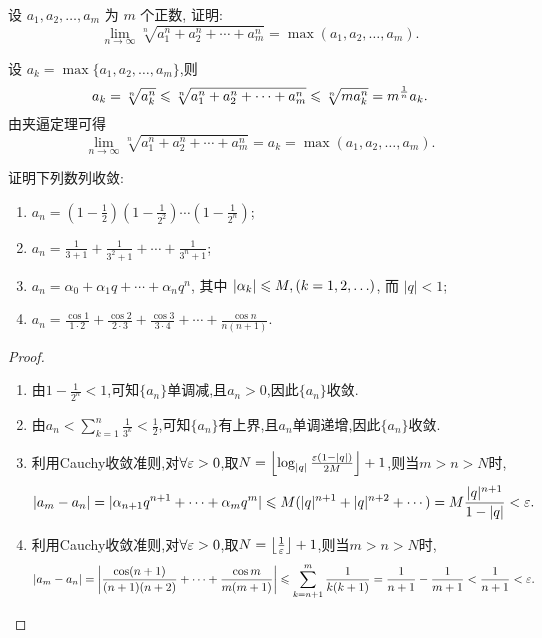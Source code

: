 \begin{exercise}[1.2.16]
    设 $a_1, a_2, \ldots, a_m$ 为 $m$ 个正数, 证明:
    $$
        \lim_{n\to\infty} \sqrt[n]{a_1^n + a_2^n + \cdots + a_m^n} = \max(a_1, a_2, \ldots, a_m).
    $$
\end{exercise}

\begin{solution}
    设 $a_k = \max \{a_1, a_2, \ldots, a_m \}$,则
    $$
        a_k = \sqrt[n]{a_k^n} \leqslant \sqrt[n]{a_1^n + a_2^n + \cdots + a_m^n} \leqslant \sqrt[n]{m a_k^n} = m^{\frac{1}{n}} a_k.
    $$
    由夹逼定理可得
    $$
        \lim_{n\to\infty} \sqrt[n]{a_1^n + a_2^n + \cdots + a_m^n} = a_k = \max(a_1, a_2, \ldots, a_m).
    $$
\end{solution}

\begin{exercise}[1.2.17]
    证明下列数列收敛:
    \begin{enumerate}[(1)]
        \item $a_n = \left(1 - \frac{1}{2}\right) \left(1 - \frac{1}{2^2}\right) \cdots \left(1 - \frac{1}{2^n}\right)$;
        \item $a_n = \frac{1}{3+1} + \frac{1}{3^2+1} + \cdots + \frac{1}{3^n+1}$;
        \item $a_n = \alpha_0 + \alpha_1 q + \cdots + \alpha_n q^n$, 其中 $|\alpha_k| \leqslant M, (k=1, 2, \ldots)$, 而 $|q| < 1$;
        \item $a_n = \frac{\cos 1}{1 \cdot 2} + \frac{\cos 2}{2 \cdot 3} + \frac{\cos 3}{3 \cdot 4} + \cdots + \frac{\cos n}{n(n+1)}$.
    \end{enumerate}
\end{exercise}

\begin{proof}
    \begin{enumerate}[(1)]
        \item 由$1-\frac{1}{2^n} < 1$,可知$\{a_n\}$单调减,且$a_n > 0$,因此$\{a_n\}$收敛.
        \item 由$a_n < \sum_{k=1}^n \frac{1}{3^k} < \frac 12$,可知$\{a_n\}$有上界,且$a_n$单调递增,因此$\{a_n\}$收敛.
        \item 利用Cauchy收敛准则,对$\forall \varepsilon >0$,取$N = \left\lfloor \log_{|q|} \frac{\varepsilon(1-|q|)}{2M} \right\rfloor + 1$,则当$m>n>N$时,$$|a_m-a_n| = |\alpha_{n+1}q^{n+1}+\cdots+\alpha_m q^m| \leqslant M(|q|^{n+1}+|q|^{n+2}+\cdots) = M\frac{|q|^{n+1}}{1-|q|} < \varepsilon.$$
        \item 利用Cauchy收敛准则,对$\forall \varepsilon >0$,取$N = \left\lfloor \frac{1}{\varepsilon} \right\rfloor + 1$,则当$m>n>N$时,$$|a_m-a_n| = \left|\frac{\cos(n+1)}{(n+1)(n+2)}+\cdots+\frac{\cos m}{m(m+1)}\right| \leqslant \sum_{k=n+1}^m \frac{1}{k(k+1)} = \frac{1}{n+1} - \frac{1}{m+1} < \frac{1}{n+1} < \varepsilon.$$
    \end{enumerate}
\end{proof}

